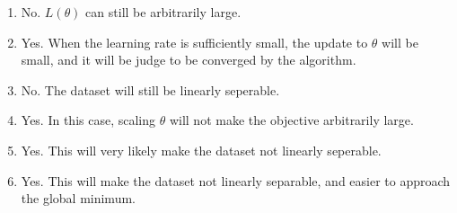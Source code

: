 \begin{answer}
\begin{enumerate}
    \item No. $L(\theta)$ can still be arbitrarily large.
  \item Yes. When the learning rate is sufficiently small, the update to $\theta$ will be small, and it will be judge to be converged by the algorithm.
  \item No. The dataset will still be linearly seperable.
  \item Yes. In this case, scaling $\theta$ will not make the objective arbitrarily large.
  \item Yes. This will very likely make the dataset not linearly seperable.
  \item Yes. This will make the dataset not linearly separable, and easier to approach the global minimum.
\end{enumerate}

\end{answer}
